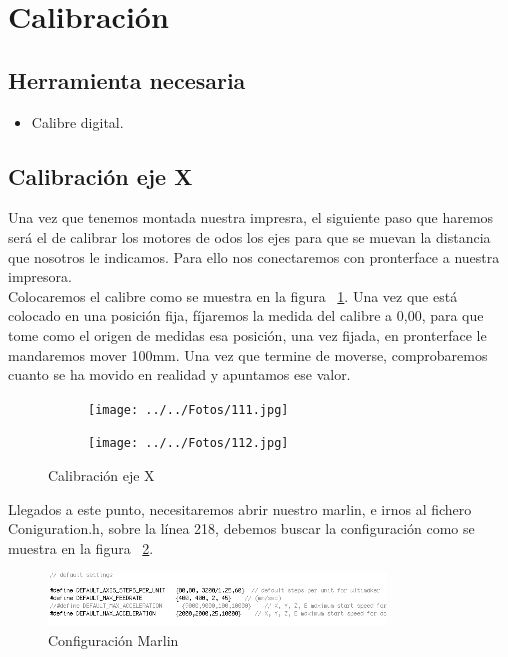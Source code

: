 
\newpage{}
\section{Calibración}
	\subsection{Herramienta necesaria}
		\begin{itemize}
			\item Calibre digital.
		\end{itemize}
	\subsection{Calibración eje X}
		Una vez que tenemos montada nuestra impresra, el siguiente paso que haremos será el de calibrar los motores de odos los ejes para que se muevan la distancia que nosotros le indicamos.
		Para ello nos conectaremos con pronterface a nuestra impresora.\\
		
		Colocaremos el calibre como se muestra en la figura ~\ref{fig:1.calibracion}. Una vez que está colocado en una posición fija, fíjaremos la medida del calibre a 0,00, para que tome como el origen de medidas esa posición, una vez fijada, en pronterface le mandaremos mover 100mm. Una vez que termine de moverse, comprobaremos cuanto se ha movido en realidad y apuntamos ese valor.\\
		\begin{figure}[H]
		        \centering
		        \begin{subfigure}[htb]{0.4\textwidth}
		                \centering
		                \texttt{[image: ../../Fotos/111.jpg]}
		                
		        \end{subfigure}
		        \begin{subfigure}[htb]{0.4\textwidth}
		                \centering
		                \texttt{[image: ../../Fotos/112.jpg]}
		                
		        \end{subfigure}
		        \caption{Calibración eje X}\label{fig:1.calibracion}
		\end{figure}
		Llegados a este punto, necesitaremos abrir nuestro marlin, e irnos al fichero Coniguration.h, sobre la línea 218, debemos buscar la configuración como se muestra en la figura 
~\ref{fig:2.calibracion}.\\	
		\begin{figure}[!htp]
			\centering
			\includegraphics[width=0.8\textwidth]{../../Fotos/119.png}
			\caption{Configuración Marlin}
			\label{fig:2.calibracion}
		\end{figure}
		
